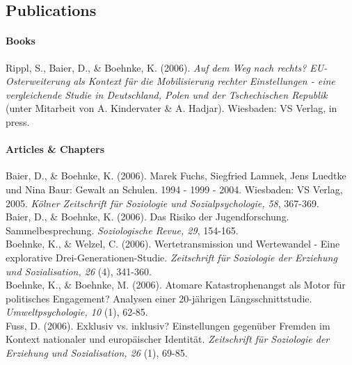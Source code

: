 \newpage


\subsection{Publications}




	\paragraph{Books} \textit{ }
\bigskip
	
Rippl, S., Baier, D., \& Boehnke, K. (2006). \textit{Auf dem Weg nach rechts? EU-Osterweiterung als Kontext f\"{u}r die Mobilisierung rechter Einstellungen - eine vergleichende Studie in Deutschland, Polen und der Tschechischen Republik} (unter Mitarbeit von A. Kindervater \& A. Hadjar). Wiesbaden: VS Verlag, in press.\\




\paragraph{Articles \& Chapters}\textit{ }

\bigskip

Baier, D., \& Boehnke, K. (2006). Marek Fuchs, Siegfried Lamnek, Jens Luedtke und Nina Baur: Gewalt an Schulen. 1994 - 1999 - 2004. Wiesbaden: VS Verlag, 2005. \textit{K\"{o}lner Zeitschrift f\"{u}r Soziologie und Sozialpsychologie, 58}, 367-369.\\

Baier, D., \& Boehnke, K. (2006). Das Risiko der Jugendforschung. Sammelbesprechung. \textit{Soziologische Revue, 29}, 154-165.\\

Boehnke, K., \& Welzel, C. (2006). Wertetransmission und Wertewandel - Eine explorative Drei-Generationen-Studie. \textit{Zeitschrift f\"{u}r Soziologie der Erziehung und Sozialisation, 26 }(4), 341-360.\\

Boehnke, K., \& Boehnke, M. (2006). Atomare Katastrophenangst als Motor f\"{u}r politisches Engagement? Analysen einer 20-j\"{a}hrigen L\"{a}ngsschnittstudie. \textit{Umweltpsychologie, 10 }(1), 62-85.\\

Fuss, D. (2006). Exklusiv vs. inklusiv? Einstellungen gegen\"{u}ber Fremden im Kontext nationaler und europ\"{a}ischer Identit\"{a}t. \textit{Zeitschrift f\"{u}r Soziologie der Erziehung und Sozialisation, 26 }(1), 69-85. \\

